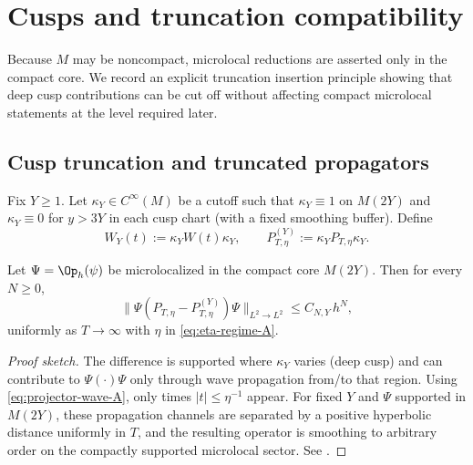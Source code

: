 \section{Cusps and truncation compatibility}\label{sec:ch5-cusps}

\noindent
Because $M$ may be noncompact, microlocal reductions are asserted only in the compact core. We record an explicit
truncation insertion principle showing that deep cusp contributions can be cut off without affecting compact
microlocal statements at the level required later.

\subsection{Cusp truncation and truncated propagators}\label{subsec:ch5-truncation}

Fix $Y\ge 1$. Let $\kappa_Y\in C^\infty(M)$ be a cutoff such that $\kappa_Y\equiv 1$ on $M(2Y)$ and $\kappa_Y\equiv 0$
for $y>3Y$ in each cusp chart (with a fixed smoothing buffer). Define
\[
W_Y(t):=\kappa_Y W(t)\kappa_Y,\qquad P_{T,\eta}^{(Y)}:=\kappa_Y P_{T,\eta}\kappa_Y.
\]

\begin{lemma}\label{lem:truncation-A}
Let $\Psi=\Op_h(\psi)$ be microlocalized in the compact core $M(2Y)$. Then for every $N\ge 0$,
\begin{equation}\label{eq:truncation-negligible-A}
\|\Psi(P_{T,\eta}-P_{T,\eta}^{(Y)})\Psi\|_{L^2\to L^2}\le C_{N,Y}\,h^{N},
\end{equation}
uniformly as $T\to\infty$ with $\eta$ in \eqref{eq:eta-regime-A}.
\end{lemma}

\begin{proof}[Proof sketch]
The difference is supported where $\kappa_Y$ varies (deep cusp) and can contribute to $\Psi(\cdot)\Psi$ only through
wave propagation from/to that region. Using \eqref{eq:projector-wave-A}, only times $|t|\le \eta^{-1}$ appear.
For fixed $Y$ and $\Psi$ supported in $M(2Y)$, these propagation channels are separated by a positive hyperbolic
distance uniformly in $T$, and the resulting operator is smoothing to arbitrary order on the compactly supported
microlocal sector. See \cite{Hejhal1983,Iwaniec2002,Hormander1985}.
\end{proof}

